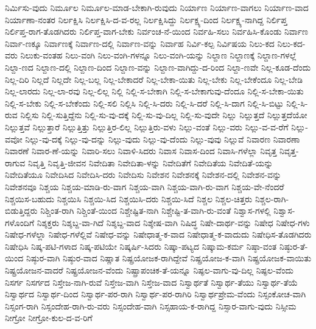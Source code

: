 {ನಿರ್ಮಿಸು-ವುದು
ನಿರ್ಮೂಲ
ನಿರ್ಮೂಲ-ಮಾಡ-ಬೇಕಾಗಿ-ರುವುದು
ನಿರ್ಯಾಣ
ನಿರ್ಯಾಣ-ವಾಗಲು
ನಿರ್ಯಾಣ-ವಾದ
ನಿರ್ಯಾಣಾ-ನಂತರ
ನಿರ್ಲಕ್ಷಿಸಿ
ನಿರ್ಲಕ್ಷಿಸಿ-ದ-ವ-ರಲ್ಲ
ನಿರ್ಲಕ್ಷಿಸಿದ್ದು
ನಿರ್ಲಕ್ಷ್ಯ-ದಿಂದ
ನಿರ್ಲಕ್ಷ್ಯ-ನಾಗಿದ್ದ
ನಿರ್ಲಿಪ್ತ
ನಿರ್ಲಿಪ್ತ-ರಾಗ-ತೊಡಗಿದರು
ನಿರ್ಲಿಪ್ತ-ವಾಗ-ಬೇಕು
ನಿರ್ವಂಚ-ನೆ-ಯಿಂದ
ನಿರ್ವಹಿ-ಸಲು
ನಿರ್ವಹಿಸಿ-ಕೊಂಡು
ನಿರ್ವಾಣ
ನಿರ್ವಾ-ಣಕ್ಕೂ
ನಿರ್ವಾಣಕ್ಕೆ
ನಿರ್ವಾಣ-ದಲ್ಲಿ
ನಿರ್ವಾಣ-ವನ್ನು
ನಿರ್ವಾಹ
ನಿರ್ವಿ-ಕಲ್ಪ
ನಿರ್ವಿಷಯ
ನಿಲು-ಕದ
ನಿಲು-ಕದ-ವರು
ನಿಲುಕು-ವಂತಹ
ನಿಲು-ವಂಗಿ
ನಿಲು-ವಂಗಿ-ಗಳನ್ನೂ
ನಿಲು-ವಂಗಿ-ಯನ್ನು
ನಿಲ್ದಾಣ
ನಿಲ್ದಾಣಕ್ಕೆ
ನಿಲ್ದಾಣ-ಗಳಲ್ಲೆ
ನಿಲ್ದಾ-ಣದ
ನಿಲ್ದಾಣ-ದಲ್ಲಿ
ನಿಲ್ದಾಣ-ದಿಂದ
ನಿಲ್ದಾಣ-ವನ್ನು
ನಿಲ್ದಾಣ-ವಾಗಿದ್ದು-ದ-ರಿಂದ
ನಿಲ್ದಾ-ಣವೇ
ನಿಲ್ಲ-ಕೂಡ-ದೆಂದು
ನಿಲ್ಲ-ದಿರಿ
ನಿಲ್ಲದೆ
ನಿಲ್ಲದೇ
ನಿಲ್ಲ-ಬಲ್ಲ
ನಿಲ್ಲ-ಬೇಕಾದರೆ
ನಿಲ್ಲ-ಬೇಕಾ-ಯಿತು
ನಿಲ್ಲ-ಬೇಕು
ನಿಲ್ಲ-ಬೇಕೆಂದೂ
ನಿಲ್ಲ-ಬೇಡಿ
ನಿಲ್ಲ-ಲಾರದು
ನಿಲ್ಲ-ಲಾ-ರವು
ನಿಲ್ಲ-ಲಿಲ್ಲ
ನಿಲ್ಲಿ
ನಿಲ್ಲಿ-ಸ-ಬೇಕಾಗಿ
ನಿಲ್ಲಿ-ಸ-ಬೇಕಾಗುವು-ದೆಂದೂ
ನಿಲ್ಲಿ-ಸ-ಬೇಕಾ-ಯಿತು
ನಿಲ್ಲಿ-ಸ-ಬೇಕು
ನಿಲ್ಲಿ-ಸ-ಬೇಕೆಂದು
ನಿಲ್ಲಿ-ಸಲಿ
ನಿಲ್ಲಿಸಿ
ನಿಲ್ಲಿ-ಸಿ-ದರು
ನಿಲ್ಲಿ-ಸಿ-ದರೆ
ನಿಲ್ಲಿ-ಸಿ-ದಾಗ
ನಿಲ್ಲಿ-ಸಿ-ಬಿಟ್ಟು
ನಿಲ್ಲಿ-ಸಿ-ರುವ
ನಿಲ್ಲಿಸು
ನಿಲ್ಲಿ-ಸುತ್ತಿದ್ದೆನು
ನಿಲ್ಲಿ-ಸು-ವು-ದಕ್ಕೆ
ನಿಲ್ಲಿ-ಸು-ವು-ದಿಲ್ಲ
ನಿಲ್ಲಿ-ಸು-ವುದೇ
ನಿಲ್ಲು
ನಿಲ್ಲುತ್ತದೆ
ನಿಲ್ಲುತ್ತದೆಯೋ
ನಿಲ್ಲುತ್ತವೆ
ನಿಲ್ಲುತ್ತಾರೆ
ನಿಲ್ಲುತ್ತಿತ್ತು
ನಿಲ್ಲುತ್ತಿರ-ಲಿಲ್ಲ
ನಿಲ್ಲುತ್ತಿರು-ವಳು
ನಿಲ್ಲು-ವಂತೆ
ನಿಲ್ಲು-ವರು
ನಿಲ್ಲು-ವ-ವ-ರೆಗೆ
ನಿಲ್ಲು-ವವೋ
ನಿಲ್ಲು-ವು-ದಕ್ಕೆ
ನಿಲ್ಲು-ವು-ದನ್ನು
ನಿಲ್ಲು-ವುದು
ನಿಲ್ಲು-ವು-ದೆಂದು
ನಿಲ್ಲು-ವುವು
ನಿಲ್ಲುವೆ
ನಿವಾರಣ
ನಿವಾರಣಾ
ನಿವಾರಣೆ
ನಿವಾರ-ಣೆ-ಯನ್ನು
ನಿವಾರಿ-ಸಲು
ನಿವಾಳಿ-ಸಿದರು
ನಿವಾಸ
ನಿವಾಸ-ದಿಂದ
ನಿವಾಸಿ-ಗಳೆಲ್ಲಾ
ನಿವೃತ್ತ
ನಿವೃತ್ತ-ರಾಗುವ
ನಿವೃತ್ತಿ
ನಿವೃತ್ತಿ-ಜೀವನ
ನಿವೇದಿತಾ
ನಿವೇದಿತಾ-ಳನ್ನು
ನಿವೇದಿತೆಗೆ
ನಿವೇದಿತೆಯ
ನಿವೇದಿತೆ-ಯನ್ನು
ನಿವೇದಿತೆಯೂ
ನಿವೇದಿಸಿದ
ನಿವೇದಿಸಿ-ದರು
ನಿವೇದಿಸು
ನಿವೇಶನ
ನಿವೇಶನಕ್ಕೆ
ನಿವೇಶನ-ದಲ್ಲಿ
ನಿವೇಶನ-ವನ್ನು
ನಿವೇಶನವೂ
ನಿಶ್ಚಯ
ನಿಶ್ಚಯ-ಮಾಡಿ-ರು-ವಾಗ
ನಿಶ್ಚಯ-ವಾಗಿ
ನಿಶ್ಚಯ-ವಾಗಿ-ರು-ವಾಗ
ನಿಶ್ಚಯ-ವೇ-ನೆಂದರೆ
ನಿಶ್ಚಯಿಸ-ಬಹುದು
ನಿಶ್ಚಯಿಸಿ
ನಿಶ್ಚಯಿ-ಸಿದ
ನಿಶ್ಚಯಿಸಿ-ದರು
ನಿಶ್ಚಯಿ-ಸಿದೆ
ನಿಶ್ಚಲ
ನಿಶ್ಚಲ-ಚಿತ್ತರು
ನಿಶ್ಚಲ-ರಾಗಿ-ಬಿಡುತ್ತಿದ್ದರು
ನಿಶ್ಚಿಂತ-ರಾಗಿ
ನಿಶ್ಚಿಂತೆ-ಯಿಂದ
ನಿಶ್ಚೇಷ್ಟಿತ-ನಾಗಿ
ನಿಶ್ಚೇಷ್ಟಿ-ತ-ವಾಗಿ-ರು-ವಂತೆ
ನಿಶ್ವಾಸ-ಗಳಲ್ಲಿ
ನಿಶ್ವಾಸ-ಗಳೊಂದಿಗೆ
ನಿಶ್ಶಕ್ತರು
ನಿಶ್ಶಬ್ದ-ವಾ-ಗಿದೆ
ನಿಶ್ಶಬ್ದ-ವಾದ
ನಿಶ್ಶೇಷ-ವಾಗಿ
ನಿಷಿದ್ಧ
ನಿಷೇ-ದಾರ್ಥ-ವನ್ನು
ನಿಷೇಧ
ನಿಷೇಧ-ಗಳು
ನಿಷೇಧ-ಗಳೆಲ್ಲಾ
ನಿಷೇಧ-ಗಳೆಲ್ಲಿವೆ
ನಿಷೇಧ-ವನ್ನು
ನಿಷೇಧಾತ್ಮ-ಕ-ವಾದ
ನಿಷೇಧಾತ್ಮ-ಕ-ವಾದುದು
ನಿಷೇಧಿಸ-ತೊಡಗಿದರು
ನಿಷೇಧಿಸಿ
ನಿಷ್ಕ-ಪಟಿ-ಗಳಾದ
ನಿಷ್ಕ-ಪಟಿಯೇ
ನಿಷ್ಕರ್ಷಿ-ಸಿದರು
ನಿಷ್ಕಾ-ಪಟ್ಯದ
ನಿಷ್ಕಾಮ-ಕರ್ಮ
ನಿಷ್ಠಾ-ವಂತ
ನಿಷ್ಠುರ-ತೆ-ಯಿಂದ
ನಿಷ್ಠುರ-ವಾಗಿ
ನಿಷ್ಠುರ-ವಾದ
ನಿಷ್ಣಾತ
ನಿಷ್ಪ್ರಯೋಜಕ-ರಾಗಿದ್ದೇವೆ
ನಿಷ್ಪ್ರಯೋಜ-ಕ-ವಾಗಿ
ನಿಷ್ಪ್ರಯೋಜಕ-ವಾಯಿತು
ನಿಷ್ಪ್ರಯೋಜನ-ವಾದರೆ
ನಿಷ್ಪ್ರಯೋಜನ-ವೆಂದು
ನಿಷ್ಪ್ರಾಪಂಚಿಕ-ತೆ-ಯನ್ನೂ
ನಿಷ್ಫಲ-ವಾಗು-ವು-ದಿಲ್ಲ
ನಿಷ್ಫಲ-ವೆಂದು
ನಿಸರ್ಗ
ನಿಸರ್ಗದ
ನಿಸ್ತೇಜ-ನಾಗಿ-ರುವೆ
ನಿಸ್ತೇಜ-ವಾಗಿ
ನಿಸ್ತೇಜ-ವಾದ
ನಿಸ್ವಾರ್ಥತೆ
ನಿಸ್ವಾರ್ಥ-ತೆಯು
ನಿಸ್ವಾರ್ಥ-ತೆಯೆ
ನಿಸ್ವಾರ್ಥದ
ನಿಸ್ವಾರ್ಥ-ದಿಂದ
ನಿಸ್ವಾರ್ಥ-ಪರ-ರಾಗಿ
ನಿಸ್ವಾರ್ಥ-ಪರ-ರಾಗಿರಿ
ನಿಸ್ವಾರ್ಥಪ್ರೇಮ-ವೆಂದು
ನಿಸ್ಸಂಕೋಚ-ವಾಗಿ
ನಿಸ್ಸಂಗ-ರಾಗಿ
ನಿಸ್ಸಂದೇಹ-ರಾಗಿ-ರು-ವರು
ನಿಸ್ಸಂದೇಹ-ವಾಗಿ
ನಿಸ್ಸಹಾಯ-ಕ-ರಾಗಿದ್ದ
ನಿಸ್ಸಾರ-ವಾಗು-ವುದು
ನಿಸ್ಸೀಮ
ನೀಗ್ರೋ
ನೀಗ್ರೋ-ಕುಲ-ದ-ವ-ರಿಗೆ
}
